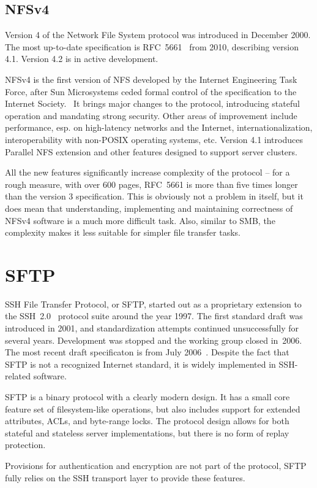 \subsection{NFSv4}

Version 4 of the Network File System protocol was introduced in December 2000. The most up-to-date
specification is RFC~5661~\cite{rfc5661} from 2010, describing version 4.1. Version 4.2 is in active
development.

NFSv4 is the first version of NFS developed by the Internet Engineering Task Force, after Sun Microsystems
ceded formal control of the specification to the Internet Society.~\cite{rfc2339} It brings major changes to
the protocol, introducing stateful operation and mandating strong security. Other areas of improvement include
performance, esp. on high-latency networks and the Internet, internationalization, interoperability with
non-POSIX operating systems, etc. Version 4.1 introduces Parallel NFS extension and other features designed to
support server clusters.

All the new features significantly increase complexity of the protocol -- for a rough measure, with over 600
pages, RFC~5661 is more than five times longer than the version 3 specification. This is obviously not
a problem in itself, but it does mean that understanding, implementing and maintaining correctness of NFSv4
software is a much more difficult task. Also, similar to SMB, the complexity makes it less suitable for
simpler file transfer tasks.

\section{SFTP}

SSH File Transfer Protocol, or SFTP, started out as a proprietary extension to the SSH~2.0~\cite{rfc4251}
protocol suite around the year 1997. The first standard draft was introduced in 2001, and standardization
attempts continued unsuccessfully for several years. Development was stopped and the working group closed
in~2006.~\cite{secsh-email} The most recent draft specificaton is from July 2006~\cite{draft-secsh-13}.
Despite the fact that SFTP is not a recognized Internet standard, it is widely implemented in SSH-related
software.

SFTP is a binary protocol with a clearly modern design. It has a small core feature set of filesystem-like
operations, but also includes support for extended attributes, ACLs, and byte-range locks.  The protocol
design allows for both stateful and stateless server implementations, but there is no form of replay
protection.

Provisions for authentication and encryption are not part of the protocol, SFTP fully relies on the SSH
transport layer to provide these features.
